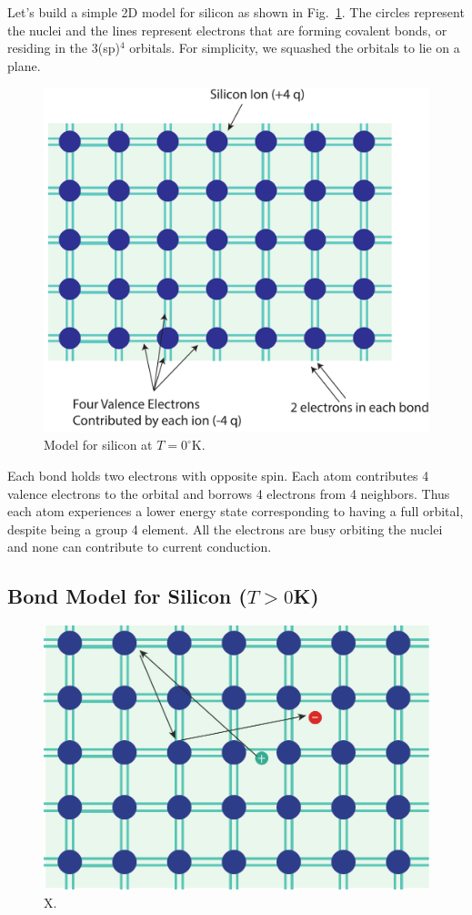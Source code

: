 Let's build a simple 2D model for silicon as shown in Fig.~\ref{fig:silicon_model}.  The circles represent the nuclei and the lines represent electrons that are forming covalent bonds, or residing in the 3(sp)$^4$ orbitals.  For simplicity, we squashed the orbitals to lie on a plane.

\begin{figure}
\begin{center}
\includegraphics[width=.5\columnwidth]{silicon_model}
\end{center}
\caption{Model for silicon at $T=0^\circ$K. } \label{fig:silicon_model}
\end{figure}

Each bond holds two electrons with opposite spin.  Each atom contributes 4 valence electrons to the orbital and borrows 4 electrons from 4 neighbors.  Thus each atom experiences a lower energy state corresponding to having a full orbital, despite being a group 4 element.  All the electrons are busy orbiting the nuclei and none can contribute to current conduction.


\subsection{Bond Model for Silicon ($T>0$K)}

\begin{figure}
\begin{center}
\includegraphics[width=.5\columnwidth]{silicon_broken_bond}
\end{center}
\caption{X. } \label{fig:silicon_broken_bond}
\end{figure}

